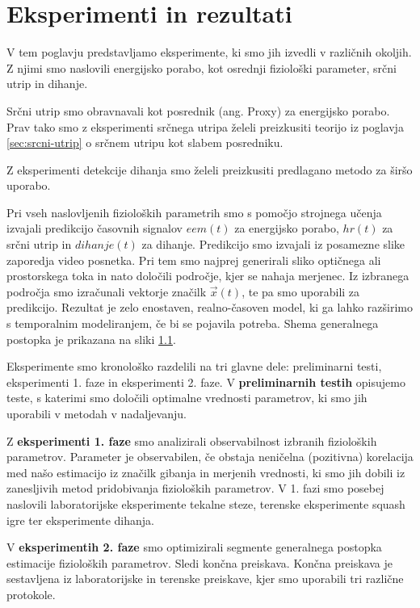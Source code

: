 \chapter{Eksperimenti in rezultati}\label{sec:eksperimenti}
V tem poglavju predstavljamo eksperimente, ki smo jih izvedli v različnih okoljih. Z njimi smo naslovili energijsko porabo, kot osrednji fiziološki parameter, srčni utrip in dihanje. 

Srčni utrip smo obravnavali kot posrednik (ang. Proxy) za energijsko porabo. Prav tako smo z eksperimenti srčnega utripa želeli preizkusiti teorijo iz poglavja \ref{sec:srcni-utrip} o srčnem utripu kot slabem posredniku.

Z eksperimenti detekcije dihanja smo želeli preizkusiti predlagano metodo za širšo uporabo.

Pri vseh naslovljenih fizioloških parametrih smo s pomočjo strojnega učenja izvajali predikcijo časovnih signalov $eem(t)$ za energijsko porabo, $hr(t)$ za srčni utrip in $dihanje(t)$ za dihanje. Predikcijo smo izvajali iz posamezne slike zaporedja video posnetka. Pri tem smo najprej generirali sliko optičnega ali prostorskega toka in nato določili področje, kjer se nahaja merjenec. Iz izbranega področja smo izračunali vektorje značilk $\vec{x}(t)$, te pa smo uporabili za predikcijo. Rezultat je zelo enostaven, realno-časoven model, ki ga lahko razširimo s temporalnim modeliranjem, če bi se pojavila potreba. Shema generalnega postopka je prikazana na sliki \ref{fig:shema-generalnega-postopka}.

\begin{figure}
\caption{}
\label{fig:shema-generalnega-postopka}
\end{figure}

Eksperimente smo kronološko razdelili na tri glavne dele: preliminarni testi, eksperimenti 1. faze in eksperimenti 2. faze. V \textbf{preliminarnih testih} opisujemo teste, s katerimi smo določili optimalne vrednosti parametrov, ki smo jih uporabili v metodah v nadaljevanju. 

Z \textbf{eksperimenti 1. faze} smo analizirali observabilnost izbranih fizioloških parametrov. Parameter je observabilen, če obstaja neničelna (pozitivna) korelacija med našo estimacijo iz značilk gibanja in merjenih vrednosti, ki smo jih dobili iz zanesljivih metod pridobivanja fizioloških parametrov. V 1. fazi smo posebej naslovili laboratorijske eksperimente tekalne steze, terenske eksperimente squash igre ter eksperimente dihanja.

V \textbf{eksperimentih 2. faze} smo optimizirali segmente generalnega postopka estimacije fizioloških parametrov. Sledi končna preiskava. Končna preiskava je sestavljena iz laboratorijske in terenske preiskave, kjer smo uporabili tri različne protokole.

